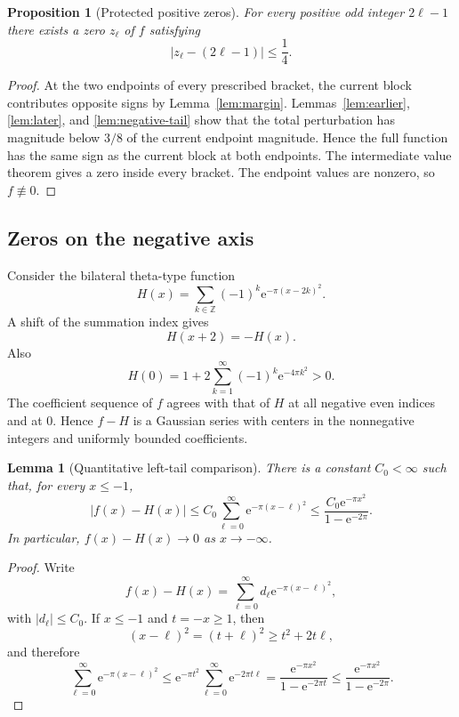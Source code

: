 \documentclass[11pt]{article}
\newtheorem{lemma}[theorem]{Lemma}
\newtheorem{proposition}[theorem]{Proposition}
\newcommand{\Z}{\mathbb{Z}}
\newcommand{\e}{\mathrm{e}}
\begin{document}
\begin{proposition}[Protected positive zeros]\label{prop:positivezeros}
For every positive odd integer $2\ell-1$ there exists a zero $z_\ell$ of $f$ satisfying
\[
 |z_\ell-(2\ell-1)|\le\frac14.
\]
\end{proposition}

\begin{proof}
At the two endpoints of every prescribed bracket, the current block contributes opposite signs by Lemma~\ref{lem:margin}. Lemmas~\ref{lem:earlier}, \ref{lem:later}, and \ref{lem:negative-tail} show that the total perturbation has magnitude below $3/8$ of the current endpoint magnitude. Hence the full function has the same sign as the current block at both endpoints. The intermediate value theorem gives a zero inside every bracket. The endpoint values are nonzero, so $f\not\equiv0$.
\end{proof}

\subsection{Zeros on the negative axis}
Consider the bilateral theta-type function
\[
 H(x)=\sum_{k\in\Z}(-1)^k\e^{-\pi(x-2k)^2}.
\]
A shift of the summation index gives
\begin{equation}\label{eq:antiperiodic}
 H(x+2)=-H(x).
\end{equation}
Also
\[
 H(0)=1+2\sum_{k=1}^{\infty}(-1)^k\e^{-4\pi k^2}>0.
\]
The coefficient sequence of $f$ agrees with that of $H$ at all negative even indices and at $0$. Hence $f-H$ is a Gaussian series with centers in the nonnegative integers and uniformly bounded coefficients.

\begin{lemma}[Quantitative left-tail comparison]\label{lem:leftcomparison}
There is a constant $C_0<\infty$ such that, for every $x\le-1$,
\[
 |f(x)-H(x)|
 \le C_0\sum_{\ell=0}^{\infty}\e^{-\pi(x-\ell)^2}
 \le\frac{C_0\e^{-\pi x^2}}{1-\e^{-2\pi}}.
\]
In particular, $f(x)-H(x)\to0$ as $x\to-\infty$.
\end{lemma}

\begin{proof}
Write
\[
 f(x)-H(x)=\sum_{\ell=0}^{\infty}d_\ell\e^{-\pi(x-\ell)^2},
\]
with $|d_\ell|\le C_0$. If $x\le-1$ and $t=-x\ge1$, then
\[
 (x-\ell)^2=(t+\ell)^2\ge t^2+2t\ell,
\]
and therefore
\[
 \sum_{\ell=0}^{\infty}\e^{-\pi(x-\ell)^2}
 \le\e^{-\pi t^2}\sum_{\ell=0}^{\infty}\e^{-2\pi t\ell}
 =\frac{\e^{-\pi x^2}}{1-\e^{-2\pi t}}
 \le\frac{\e^{-\pi x^2}}{1-\e^{-2\pi}}.
\]
\end{proof}
\end{document}
